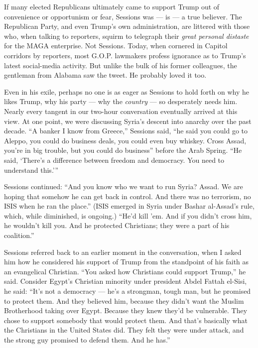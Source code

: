 If many elected Republicans ultimately came to support Trump out of
convenience or opportunism or fear, Sessions was --- is --- a true
believer. The Republican Party, and even Trump's own administration, are
littered with those who, when talking to reporters, squirm to telegraph
their \emph{great personal distaste} for the MAGA enterprise. Not
Sessions. Today, when cornered in Capitol corridors by reporters, most
G.O.P. lawmakers profess ignorance as to Trump's latest social-media
activity. But unlike the bulk of his former colleagues, the gentleman
from Alabama saw the tweet. He probably loved it too.

Even in his exile, perhaps no one is as eager as Sessions to hold forth
on why he likes Trump, why his party --- why the \emph{country} --- so
desperately needs him. Nearly every tangent in our two-hour conversation
eventually arrived at this view. At one point, we were discussing
Syria's descent into anarchy over the past decade. ``A banker I know
from Greece,'' Sessions said, ``he said you could go to Aleppo, you
could do business deals, you could even buy whiskey. Cross Assad, you're
in big trouble, but you could do business'' before the Arab Spring. ``He
said, `There's a difference between freedom and democracy. You need to
understand this.'''

Sessions continued: ``And you know who we want to run Syria? Assad. We
are hoping that somehow he can get back in control. And there was no
terrorism, no ISIS when he ran the place.'' (ISIS emerged in Syria under
Bashar al-Assad's rule, which, while diminished, is ongoing.) ``He'd
kill 'em. And if you didn't cross him, he wouldn't kill you. And he
protected Christians; they were a part of his coalition.''

Sessions referred back to an earlier moment in the conversation, when I
asked him how he considered his support of Trump from the standpoint of
his faith as an evangelical Christian. ``You asked how Christians could
support Trump,'' he said. Consider Egypt's Christian minority under
president Abdel Fattah el-Sisi, he said: ``It's not a democracy --- he's
a strongman, tough man, but he promised to protect them. And they
believed him, because they didn't want the Muslim Brotherhood taking
over Egypt. Because they knew they'd be vulnerable. They chose to
support somebody that would protect them. And that's basically what the
Christians in the United States did. They felt they were under attack,
and the strong guy promised to defend them. And he has.''

